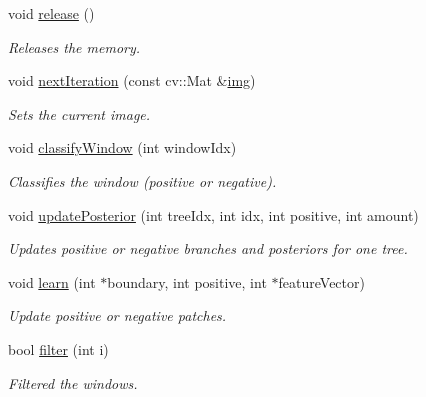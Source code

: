 \begin{DoxyCompactItemize}
void \hyperlink{classtld_1_1EnsembleClassifier_a3fd93c80d37f7f115443c2e147ec9967}{release} ()
\begin{DoxyCompactList}\small\item\em Releases the memory. \end{DoxyCompactList}\item 
void \hyperlink{classtld_1_1EnsembleClassifier_a7871296c03de06293ebd3dc29ecab5de}{next\-Iteration} (const cv\-::\-Mat \&\hyperlink{classtld_1_1EnsembleClassifier_a0894da7012fdd72a562dbf78f719bfe9}{img})
\begin{DoxyCompactList}\small\item\em Sets the current image. \end{DoxyCompactList}\item 
void \hyperlink{classtld_1_1EnsembleClassifier_abf7e915ff675720293502be0452cb6c2}{classify\-Window} (int window\-Idx)
\begin{DoxyCompactList}\small\item\em Classifies the window (positive or negative). \end{DoxyCompactList}\item 
void \hyperlink{classtld_1_1EnsembleClassifier_acfc0c9d71c16dfed9750b6aa409afb0c}{update\-Posterior} (int tree\-Idx, int idx, int positive, int amount)
\begin{DoxyCompactList}\small\item\em Updates positive or negative branches and posteriors for one tree. \end{DoxyCompactList}\item 
void \hyperlink{classtld_1_1EnsembleClassifier_ad088404fdea039b774c2eb088e4cfc04}{learn} (int $\ast$boundary, int positive, int $\ast$feature\-Vector)
\begin{DoxyCompactList}\small\item\em Update positive or negative patches. \end{DoxyCompactList}\item 
bool \hyperlink{classtld_1_1EnsembleClassifier_a42f1f3606d14a7d274f5bb9f4fa5030f}{filter} (int i)
\begin{DoxyCompactList}\small\item\em Filtered the windows. \end{DoxyCompactList}\end{DoxyCompactItemize}
